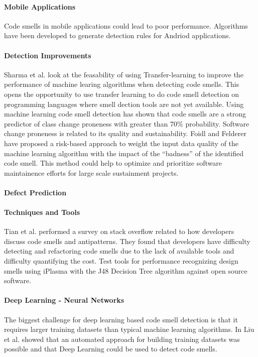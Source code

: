 \documentclass[conference]{IEEEtran}
\begin{document}
\paragraph{Mobile Applications}
Code smells in mobile applications could lead to poor performance. Algorithms have been developed\cite{rubin_sniffing_2019} to generate detection rules for Andriod applications.
\paragraph{Detection Improvements}
Sharma et al.\cite{sharma_feasibility_2019} look at the feasability of using Transfer-learning to improve the performance of machine learing algorithms when detecting code smells. This opens the opportunity to use transfer learning to do code smell detection on programming languages where smell dection tools are not yet available.
Using machine learning code smell detection has shown that code smells are a strong predictor of class change proneness\cite{pritam_assessment_2019} with greater than 70\% probability. Software change proneness is related to its quality and sustainability.
Foidl and Felderer have proposed\cite{foidl_risk-based_2019} a risk-based approach to weight the input data quality of the machine learning algorithm with the impact of the ``badness'' of the identified code smell. 
This method could help to optimize and prioritize software maintainence efforts for large scale sustainment projects.
\paragraph{Defect Prediction}
\paragraph{Techniques and Tools}
Tian et al.\cite{tian_how_2019} performed a survey on stack overflow related to how developers discuss code smells and antipatterns. 
They found that developers have difficulty detecting and refactoring code smells due to the lack of available tools and difficulty quantifying the cost.
Test tools for performance recognizing design smells using iPlasma with the J48 Decision Tree algorithm\cite{singh_systematic_2018} against open source software.
\paragraph{Deep Learning - Neural Networks} The biggest challenge for deep learning based code smell detection\cite{liu_deep_2019} is that it requires larger training datasets than typical machine learning algorithms. In \cite{liu_deep_2019} Liu et al. showed that an automated approach for building training datasets was possible and that Deep Learning could be used to detect code smells.
\end{document}
